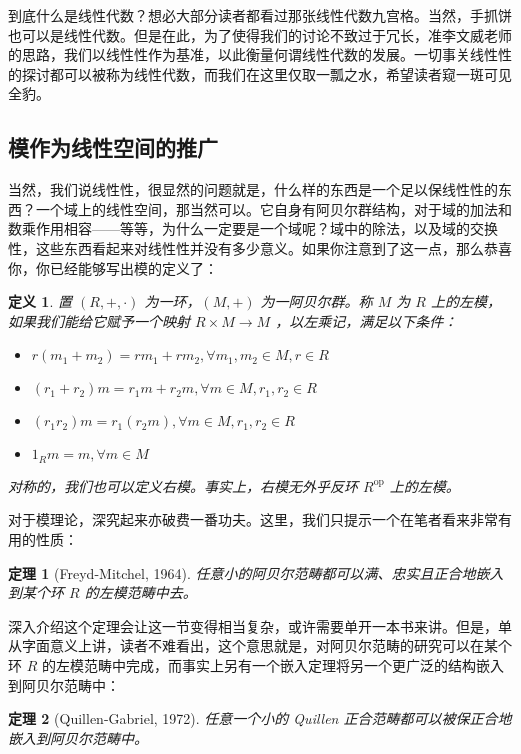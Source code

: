 \documentclass{ctexbook}
\newtheorem{definition}{定义}[chapter] %
\newtheorem{theorem}{定理}[chapter]
\begin{document}
到底什么是线性代数？想必大部分读者都看过那张线性代数九宫格。当然，手抓饼也可以是线性代数。但是在此，为了使得我们的讨论不致过于冗长，准李文威老师的思路，我们以线性性作为基准，以此衡量何谓线性代数的发展。一切事关线性性的探讨都可以被称为线性代数，而我们在这里仅取一瓢之水，希望读者窥一斑可见全豹。

\subsection{模作为线性空间的推广}

当然，我们说线性性，很显然的问题就是，什么样的东西是一个足以保线性性的东西？一个域上的线性空间，那当然可以。它自身有阿贝尔群结构，对于域的加法和数乘作用相容——等等，为什么一定要是一个域呢？域中的除法，以及域的交换性，这些东西看起来对线性性并没有多少意义。如果你注意到了这一点，那么恭喜你，你已经能够写出模的定义了：

\begin{definition}
    置 $(R, +, \cdot)$ 为一环，$(M, +)$ 为一阿贝尔群。称 $M$ 为 $R$ 上的左模，如果我们能给它赋予一个映射 $R \times M \to M$ ，以左乘记，满足以下条件：

    \begin{itemize}
        \item $r(m_1 + m_2) = rm_1 + rm_2, \forall m_1, m_2 \in M, r \in R$
        \item $(r_1 + r_2)m = r_1m + r_2m, \forall m \in M, r_1, r_2 \in R$
        \item $(r_1r_2)m = r_1(r_2m), \forall m \in M, r_1, r_2 \in R$
        \item $1_Rm = m, \forall m \in M$
    \end{itemize}

    对称的，我们也可以定义右模。事实上，右模无外乎反环 $R^{\mathrm{op}}$ 上的左模。
\end{definition}

对于模理论，深究起来亦破费一番功夫。这里，我们只提示一个在笔者看来非常有用的性质：

\begin{theorem}[Freyd-Mitchel, 1964]
    任意小的阿贝尔范畴都可以满、忠实且正合地嵌入到某个环 $R$ 的左模范畴中去。
\end{theorem}

深入介绍这个定理会让这一节变得相当复杂，或许需要单开一本书来讲。但是，单从字面意义上讲，读者不难看出，这个意思就是，对阿贝尔范畴的研究可以在某个环 $R$ 的左模范畴中完成，而事实上另有一个嵌入定理将另一个更广泛的结构嵌入到阿贝尔范畴中：

\begin{theorem}[Quillen-Gabriel, 1972]
    任意一个小的 Quillen 正合范畴都可以被保正合地嵌入到阿贝尔范畴中。
\end{theorem}
\end{document}
